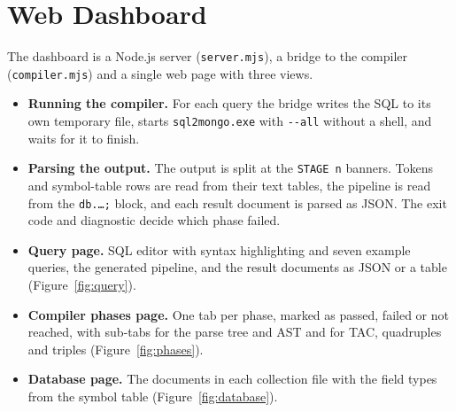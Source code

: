 \documentclass[12pt,a4paper]{report}
\newcommand{\codeus}{\textunderscore\allowbreak}
\DeclareRobustCommand{\code}[1]{\texttt{\let\_\codeus #1}}
\begin{document}
\section{Web Dashboard}
The dashboard is a Node.js server (\code{server.mjs}), a bridge to the compiler (\code{compiler.mjs}) and a single web page with three views.
\begin{itemize}
  \item \textbf{Running the compiler.} For each query the bridge writes the SQL to its own temporary file, starts \code{sql2mongo.exe} with \code{-{}-all} without a shell, and waits for it to finish.
  \item \textbf{Parsing the output.} The output is split at the \code{STAGE n} banners. Tokens and symbol-table rows are read from their text tables, the pipeline is read from the \code{db.\ldots;} block, and each result document is parsed as JSON. The exit code and diagnostic decide which phase failed.
  \item \textbf{Query page.} SQL editor with syntax highlighting and seven example queries, the generated pipeline, and the result documents as JSON or a table (Figure~\ref{fig:query}).
  \item \textbf{Compiler phases page.} One tab per phase, marked as passed, failed or not reached, with sub-tabs for the parse tree and AST and for TAC, quadruples and triples (Figure~\ref{fig:phases}).
  \item \textbf{Database page.} The documents in each collection file with the field types from the symbol table (Figure~\ref{fig:database}).
\end{itemize}
\end{document}
